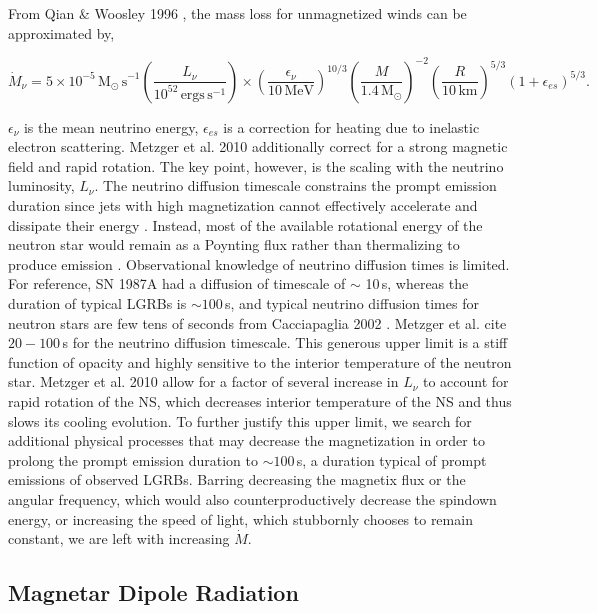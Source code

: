 \documentclass{article}
\begin{document}
From Qian \&  Woosley 1996 \cite{QianWoos:1996ap}, the mass loss for unmagnetized winds can be approximated by,

\begin{equation}
\dot{M}_\nu = 5 \times 10^{-5}\,\mathrm{M_{\odot}\, s}^{-1} \left(\frac{L_\nu}{10^{52}\, \mathrm{ergs\, s}^{-1}}\right) \times \left(\frac{\epsilon_\nu}{10\, \mathrm{MeV}}\right)^{10/3} \left(\frac{M}{1.4\, \mathrm{M}_{\odot}}\right)^{-2} \left(\frac{R}{10\, \mathrm{km}}\right)^{5/3}\left(1+ \epsilon_{es}\right)^{5/3}.
\end{equation}

$\epsilon_\nu$ is the mean neutrino energy, $\epsilon_{es}$ is a correction for heating due to inelastic electron scattering. Metzger et al. 2010 \cite{Metzger:2010pp} additionally  correct for a strong magnetic field and rapid rotation.
The key point, however, is the scaling with the neutrino luminosity, $L_\nu$. The neutrino diffusion timescale constrains the prompt emission duration since jets with high magnetization cannot effectively accelerate and dissipate their energy \cite{Metzger:2010pp}. Instead, most of the available rotational energy of the neutron star would remain as a Poynting flux rather than thermalizing to produce emission \cite{Metzger:2010pp}. Observational knowledge of neutrino diffusion times is limited. For reference, SN 1987A had a diffusion of timescale of $\sim$ 10\,s, whereas the duration of typical LGRBs is $\sim 100$\,s, and typical neutrino diffusion times for neutron stars are few tens of seconds from Cacciapaglia 2002 \cite{Cacciapaglia:2002qr}. Metzger et al. \cite{Metzger:2010pp} cite $20-100$\,s for the neutrino diffusion timescale. This generous upper limit is a stiff function of opacity and highly sensitive to the interior temperature of the neutron star. Metzger et al. 2010 allow for a factor of several increase in $L_\nu$ to account for rapid rotation of the NS, which decreases interior temperature of the NS and thus slows its cooling evolution. To further justify this upper limit, we search for additional physical processes that may decrease the magnetization in order to prolong the prompt emission duration to $\sim 100$\,s, a duration typical of prompt emissions of observed LGRBs. Barring decreasing the magnetix flux or the angular frequency, which would also counterproductively decrease the spindown energy, or increasing the speed of light, which stubbornly chooses to remain constant,  we are left with increasing $\dot{M}$. 

\subsection{Magnetar Dipole Radiation} \label{sec:dipole}
\end{document}
